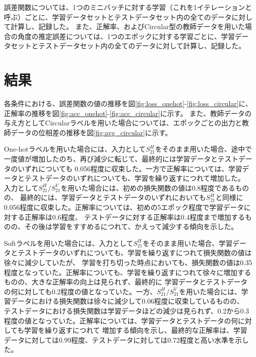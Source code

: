 \documentclass[11pt,a4paper,uplatex]{ujarticle}
\begin{document}
  誤差関数については、1つのミニバッチに対する学習（これを1イテレーションと呼ぶ）ごとに、学習データセットとテストデータセット内の全てのデータに対して計算し、記録した。
  また、正解率、およびCircular型の教師データを用いた場合の角度の推定誤差については、1つのエポックに対する学習ごとに、学習データセットとテストデータセット内の全てのデータに対して計算し、記録した。

\section{結果}

  各条件における、誤差関数の値の推移を図\ref{fig:loss_onehot}-\ref{fig:loss_circular}に、正解率の推移を図\ref{fig:acc_onehot}-\ref{fig:acc_circular}に示す。
  また、教師データの与え方としてCircularラベルを用いた場合については、エポックごとの出力と教師データの位相差の推移を図\ref{fig:avg_circular}に示す。

  One-hotラベルを用いた場合には、入力として$S_21^H$をそのまま用いた場合、途中で一度値が増加したのち、再び減少に転じて、最終的には学習データとテストデータのいずれについても
  0.056程度に収束した。一方で正解率については、学習データとテストデータのいずれについても、学習を繰り返すにつれて増加した。
  入力として$S_21^H/S_21^V$を用いた場合には、初めの損失関数の値は0.8程度であるものの、
  最終的には、学習データとテストデータのいずれにおいても$S_21^H$と同様に0.056程度に収束した。正解率については、初めの5エポック程度で学習データに対する正解率は0.6程度、
  テストデータに対する正解率は0.4程度まで増加するものの、その後は学習をすすめるにつれて、かえって減少する傾向を示した。

  Softラベルを用いた場合には、入力として$S_21^H$をそのまま用いた場合、学習データとテストデータのいずれについても、学習を繰り返すにつれて損失関数の値は徐々に減少していたが、
  学習を打ち切った時点においても、損失関数の値は0.35程度となっていた。正解率についても、学習を繰り返すにつれて徐々に増加するものの、大きな正解率の向上は見られず、最終的に
  学習データとテストデータの何に対しても0.2程度の値となっていた。一方、$S_21^H/S_21^V$を用いた場合には、学習データにおける損失関数は徐々に減少して0.06程度に収束しているものの、
  テストデータにおける損失関数は学習データほどの減少は見られず、0.2から0.3程度の値となっていた。正解率については、学習データとテストデータの何に対しても学習を繰り返すにつれて
  増加する傾向を示し、最終的な正解率は、学習データに対しては0.99程度、テストデータに対しては0.72程度と高い水準を示した。
\end{document}
